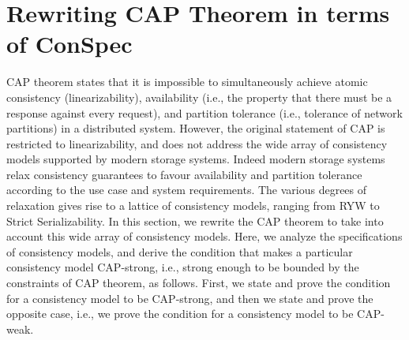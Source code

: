 \documentclass{sig-alternate-05-2015}
\begin{document}
\section{Rewriting CAP Theorem in terms of ConSpec}
 CAP theorem \cite{brew:cap, Gilbert:2002:BCF:564585.564601} states that it is impossible to simultaneously achieve atomic consistency (linearizability), availability (i.e.,
 the property that there must be a response against every request), and partition tolerance (i.e., tolerance of network partitions)
 in a distributed system. However, the original statement of CAP is restricted to linearizability, and does not address
 the wide array of consistency models supported by modern storage systems. Indeed modern storage systems relax consistency
 guarantees to favour  availability and partition tolerance according to the use case and system requirements. The
 various degrees of relaxation gives rise to a lattice of consistency models, ranging from RYW to Strict Serializability.
 In this section, we rewrite the CAP theorem to take into account this wide array of consistency models. Here, we analyze
 the specifications of consistency models, and derive the condition that makes a particular consistency model
 CAP-strong, i.e., strong enough to be bounded by the constraints of CAP theorem, as follows. First, we state and prove the condition for a consistency model to be CAP-strong, and then we state and prove the opposite case, i.e., we prove the condition for a consistency model to be CAP-weak.  %
\end{document}
